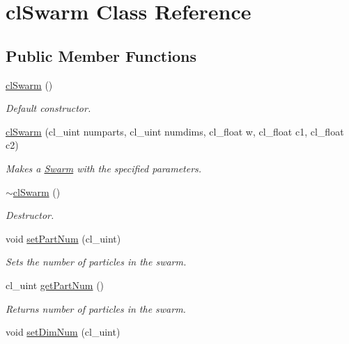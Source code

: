 \hypertarget{classclSwarm}{}\section{cl\+Swarm Class Reference}
\label{classclSwarm}
\subsection*{Public Member Functions}
\begin{DoxyCompactItemize}
\item 
\mbox{\hyperlink{classclSwarm_a313c4986c9ae21c2649005e8b94c9756}{cl\+Swarm}} ()
\begin{DoxyCompactList}\small\item\em Default constructor. \end{DoxyCompactList}\item 
\mbox{\hyperlink{classclSwarm_a775e5804fa6fbc42cac5566652666717}{cl\+Swarm}} (cl\+\_\+uint numparts, cl\+\_\+uint numdims, cl\+\_\+float w, cl\+\_\+float c1, cl\+\_\+float c2)
\begin{DoxyCompactList}\small\item\em Makes a \mbox{\hyperlink{classSwarm}{Swarm}} with the specified parameters. \end{DoxyCompactList}\item 
\mbox{\hyperlink{classclSwarm_a5a639c0b43afc091fbf099887746da76}{$\sim$cl\+Swarm}} ()
\begin{DoxyCompactList}\small\item\em Destructor. \end{DoxyCompactList}\item 
void \mbox{\hyperlink{classclSwarm_ab9e5dbb1c3f411d1dd412c6119694106}{set\+Part\+Num}} (cl\+\_\+uint)
\begin{DoxyCompactList}\small\item\em Sets the number of particles in the swarm. \end{DoxyCompactList}\item 
\mbox{\label{classclSwarm_a9da33f38e51ec38444660dabc8b53761}} 
cl\+\_\+uint \mbox{\hyperlink{classclSwarm_a9da33f38e51ec38444660dabc8b53761}{get\+Part\+Num}} ()
\begin{DoxyCompactList}\small\item\em Returns number of particles in the swarm. \end{DoxyCompactList}\item 
void \mbox{\hyperlink{classclSwarm_a2329aed460d32c0d20c5baa54af5d673}{set\+Dim\+Num}} (cl\+\_\+uint)

\end{DoxyCompactItemize}
